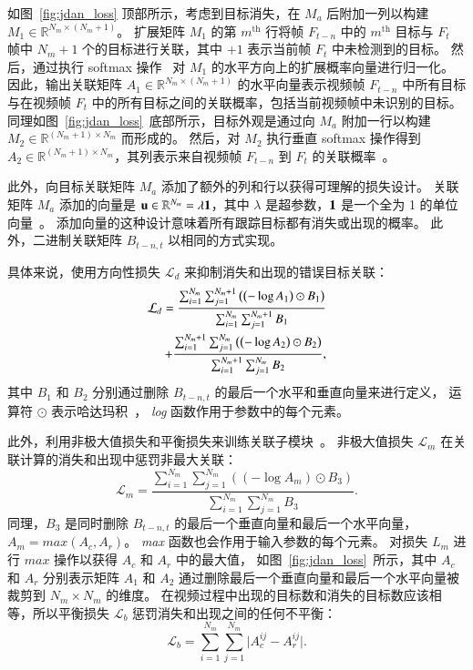 如图~\ref{fig:jdan_loss} 顶部所示，考虑到目标消失，在 $M_a$ 后附加一列以构建 $M_1 \in \mathbb R^{N_m \times (N_m + 1)}$。
扩展矩阵 $M_{1}$ 的第 $m^{\text{th}}$ 行将帧 $F_{t-n}$ 中的 $m^{\text{th}}$ 目标与 $F_t$ 帧中 $N_m+1$ 个的目标进行关联，其中 $+1$ 表示当前帧 $F_t$ 中未检测到的目标。
然后，通过执行 softmax 操作~\cite{train_mot} 对 $M_1$ 的水平方向上的扩展概率向量进行归一化。
因此，输出关联矩阵 $A_{1} \in \mathbb R^{N_m \times (N_m +1 )}$ 的水平向量表示视频帧 $F_{t-n}$ 中所有目标与在视频帧 $F_t$ 中的所有目标之间的关联概率，包括当前视频帧中未识别的目标。
同理如图~\ref{fig:jdan_loss}~底部所示，目标外观是通过向 $M_a$ 附加一行以构建 $ M_2 \in \mathbb R^{ (N_m + 1) \times N_m}$ 而形成的。
然后，对 $M_2$ 执行垂直 softmax 操作得到 $A_2 \in \mathbb R^{(N_m +1) \times N_m}$，其列表示来自视频帧 $F_{t-n}$ 到 $F_t$ 的关联概率~\cite{train_mot}。


此外，向目标关联矩阵 $M_a$ 添加了额外的列和行以获得可理解的损失设计。
关联矩阵 $M_a$ 添加的向量是 ${\bf u} \in \mathbb R^{N_m} = \lambda {\bf 1} $，其中 $\lambda$ 是超参数，${\bf 1}$ 是一个全为 1 的单位向量~\cite{dan}。
添加向量的这种设计意味着所有跟踪目标都有消失或出现的概率。
此外，二进制关联矩阵 $B_{t-n,t}$ 以相同的方式实现。

具体来说，使用方向性损失 $\mathcal L_{d}$ 来抑制消失和出现的错误目标关联：
\begin{align}
\mathcal L_d = \frac{\sum_{i=1}^{N_m} \sum_{j=1}^{N_m+1} \left( \left(-\log { A_1} \right) \odot {B}_1 \right)}{ \sum_{i=1}^{N_m} \sum_{j=1}^{N_m+1} B_1 }  
\notag  \\
+ \frac{ \sum_{i=1}^{N_m+1} \sum_{j=1}^{N_m} \left( \left(-\log { A_2} \right) \odot {B}_2 \right)}{\sum_{i=1}^{N_m+1} \sum_{j=1}^{N_m} B_2},
\end{align}
其中 $B_1$ 和 $B_2$ 分别通过删除 $B_{t-n,t}$ 的最后一个水平和垂直向量来进行定义，
运算符 $\odot$ 表示哈达玛积~\cite{hadamard}，
\textit{log} 函数作用于参数中的每个元素。

此外，利用非极大值损失和平衡损失来训练关联子模块~\cite{dan}。
非极大值损失 $\mathcal L_{m}$ 在关联计算的消失和出现中惩罚非最大关联：
\begin{equation}
\mathcal L_m = \frac{ \sum_{i=1}^{N_m} \sum_{j=1}^{N_m} \left( \left(-\log A_m \right) \odot {B}_3 \right)}{\sum_{i=1}^{N_m} \sum_{j=1}^{N_m} B_3}.
\end{equation}
同理，$B_3$ 是同时删除 $B_{t-n,t}$ 的最后一个垂直向量和最后一个水平向量，
$A_m = max (A_c, A_r)$。
\textit{max} 函数也会作用于输入参数的每个元素。
对损失 $L_m$ 进行 $max$ 操作以获得 $A_c$ 和 $A_r$ 中的最大值，
如图~\ref{fig:jdan_loss}~所示，其中 $A_c$ 和 $A_r$ 分别表示矩阵 $A_1$ 和 $A_2$ 通过删除最后一个垂直向量和最后一个水平向量被裁剪到 $N_m \times N_m$ 的维度。
在视频过程中出现的目标数和消失的目标数应该相等，所以平衡损失 $\mathcal L_b$ 惩罚消失和出现之间的任何不平衡：
\begin{equation}
\mathcal L_b =  \sum_{i=1}^{N_m} \sum_{j=1}^{N_m} \lvert A_c^{ij} - A_r^{ij} \rvert. 
\end{equation}

